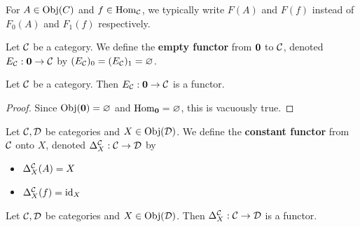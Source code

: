 \documentclass{book}
\begin{document}
	\begin{note}
		For $A \in \operatorname{Obj}(C)$ and $f \in \operatorname{Hom}_{\mathcal{C}}$, we typically write $F(A)$ and $F(f)$ instead of $F_0(A)$ and $F_1(f)$ respectively.
	\end{note}

	\begin{defn}
		Let $\mathcal{C}$ be a category. We define the \textbf{empty functor} from $\operatorname*{\mathbf{0}}$ to $\mathcal{C}$, denoted $E_{\mathcal{C}}: \operatorname*{\mathbf{0}} \rightarrow \mathcal{C}$ by $(E_{\mathcal{C}})_0 = (E_{\mathcal{C}})_1 = \varnothing$. 
	\end{defn}

	\begin{ex}
		Let $\mathcal{C}$ be a category. Then $E_{\mathcal{C}}: \operatorname*{\mathbf{0}} \rightarrow \mathcal{C}$ is a functor.
	\end{ex}

	\begin{proof}
		Since $\operatorname{Obj}(\operatorname*{\mathbf{0}}) = \varnothing$ and $\operatorname{Hom}_{\operatorname*{\mathbf{0}}} = \varnothing$, this is vacuously true. 
	\end{proof}

	\begin{defn}
		Let $\mathcal{C}, \mathcal{D}$ be categories and $X \in \operatorname{Obj}(\mathcal{D})$. We define the \textbf{constant functor} from $\mathcal{C}$ onto $X$, denoted $\Delta^{\mathcal{C}}_X: \mathcal{C} \rightarrow \mathcal{D}$ by 
		\begin{itemize}
			\item $\Delta^{\mathcal{C}}_X (A) = X$
			\item $\Delta^{\mathcal{C}}_X (f) = \operatorname{id}_X$
		\end{itemize}
	\end{defn}
	
	\begin{ex}
		Let $\mathcal{C}, \mathcal{D}$ be categories and $X \in \operatorname{Obj}(\mathcal{D})$. Then $\Delta^{\mathcal{C}}_X : \mathcal{C} \rightarrow \mathcal{D}$ is a functor.
	\end{ex}
\end{document}
